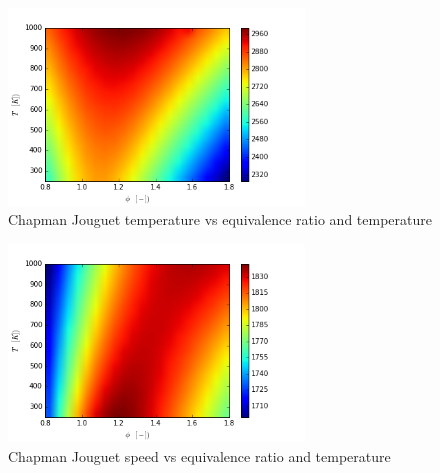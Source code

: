 \documentclass[11pt,a4paper]{article}
\begin{document}
\begin{figure}[h]
    \centering
    \includegraphics[width=0.7\textwidth]{CJ_T_phi_T_}
    \caption{Chapman Jouguet temperature vs equivalence ratio and temperature}
    \label{fig:G}
\end{figure}
\clearpage
\begin{figure}[h]
    \centering
    \includegraphics[width=0.7\textwidth]{CJ_V_phi_T_}
    \caption{Chapman Jouguet speed vs equivalence ratio and temperature}
    \label{fig:H}
\end{figure}
\end{document}

